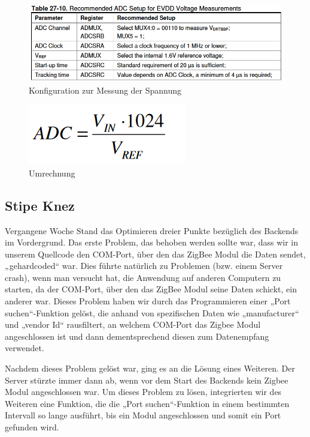 \documentclass[]{article}
\begin{document}
\begin{figure}[!h]
	\centering
	\includegraphics[scale=0.60]{images/Einstellungen}
	\caption{Konfiguration zur Messung der Spannung}
	\label{img:Konfiguration}
\end{figure}

\begin{figure}[!h]
	\centering
	\includegraphics[scale=0.60]{images/Formel}
	\caption{Umrechnung}
	\label{img:Formel}
\end{figure}



\subsection{Stipe Knez}
Vergangene Woche Stand das Optimieren dreier Punkte bezüglich des Backends im Vordergrund. Das erste Problem, das behoben werden sollte war, dass wir in unserem Quellcode den COM-Port, über den das ZigBee Modul die Daten sendet, „gehardcoded“ war. Dies führte natürlich zu Problemen (bzw. einem Server crash), wenn man versucht hat, die Anwendung auf anderen Computern zu starten, da der COM-Port, über den das ZigBee Modul seine Daten schickt, ein anderer war. Dieses Problem haben wir durch das Programmieren einer „Port suchen“-Funktion gelöst, die anhand von spezifischen Daten wie „manufacturer“ und „vendor Id“ rausfiltert, an welchem COM-Port das Zigbee Modul angeschlossen ist und dann dementsprechend diesen zum Datenempfang verwendet.

Nachdem dieses Problem gelöst war, ging es an die Lösung eines Weiteren. Der Server stürzte immer dann ab, wenn vor dem Start des Backends kein Zigbee Modul angeschlossen war. Um dieses Problem zu lösen, integrierten wir des Weiteren eine Funktion, die die „Port suchen“-Funktion in einem bestimmten Intervall so lange ausführt, bis ein Modul angeschlossen und somit ein Port gefunden wird.
\end{document}
